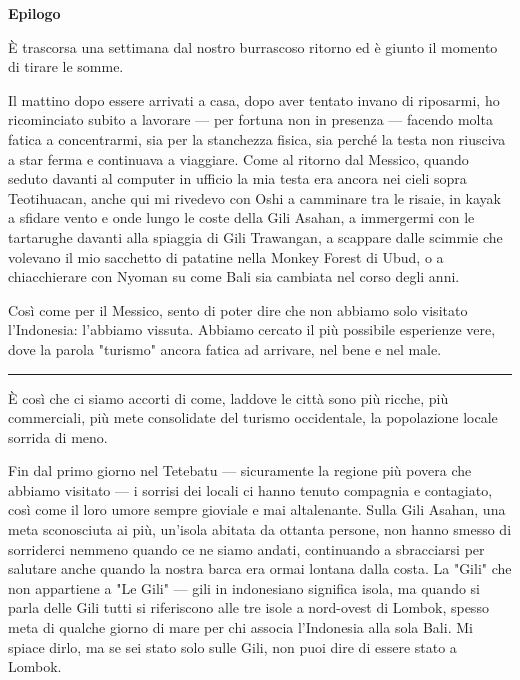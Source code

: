\begin{center}
    {\large \textbf{Epilogo}}
\end{center}

\noindent \newline \newline


È trascorsa una settimana dal nostro burrascoso ritorno ed è giunto il momento di tirare le somme.

Il mattino dopo essere arrivati a casa, dopo aver tentato invano di riposarmi, ho ricominciato subito a lavorare — per fortuna non in presenza — facendo molta fatica a concentrarmi, sia per la stanchezza fisica, sia perché la testa non riusciva a star ferma e continuava a viaggiare. Come al ritorno dal Messico, quando seduto davanti al computer in ufficio la mia testa era ancora nei cieli sopra Teotihuacan, anche qui mi rivedevo con Oshi a camminare tra le risaie, in kayak a sfidare vento e onde lungo le coste della Gili Asahan, a immergermi con le tartarughe davanti alla spiaggia di Gili Trawangan, a scappare dalle scimmie che volevano il mio sacchetto di patatine nella Monkey Forest di Ubud, o a chiacchierare con Nyoman su come Bali sia cambiata nel corso degli anni.

Così come per il Messico, sento di poter dire che non abbiamo solo visitato l'Indonesia: l'abbiamo vissuta. Abbiamo cercato il più possibile esperienze vere, dove la parola "turismo" ancora fatica ad arrivare, nel bene e nel male.

\begin{center}
    \noindent\rule{0.6\textwidth}{0.4pt}
\end{center}

È così che ci siamo accorti di come, laddove le città sono più ricche, più commerciali, più mete consolidate del turismo occidentale, la popolazione locale sorrida di meno.

Fin dal primo giorno nel Tetebatu — sicuramente la regione più povera che abbiamo visitato — i sorrisi dei locali ci hanno tenuto compagnia e contagiato, così come il loro umore sempre gioviale e mai altalenante. Sulla Gili Asahan, una meta sconosciuta ai più, un'isola abitata da ottanta persone, non hanno smesso di sorriderci nemmeno quando ce ne siamo andati, continuando a sbracciarsi per salutare anche quando la nostra barca era ormai lontana dalla costa. La "Gili" che non appartiene a "Le Gili" — gili in indonesiano significa isola, ma quando si parla delle Gili tutti si riferiscono alle tre isole a nord-ovest di Lombok, spesso meta di qualche giorno di mare per chi associa l'Indonesia alla sola Bali. Mi spiace dirlo, ma se sei stato solo sulle Gili, non puoi dire di essere stato a Lombok.

